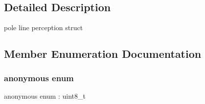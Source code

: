 \subsection{Detailed Description}
pole line perception struct 

\subsection{Member Enumeration Documentation}
\mbox{\label{structmaf__perception__interface_1_1PoleLinePerception_a1f64c2d0c8b62681041cae3bec29b634}} 
\subsubsection{\texorpdfstring{anonymous enum}{anonymous enum}}
{\footnotesize\ttfamily anonymous enum \+: uint8\+\_\+t}

